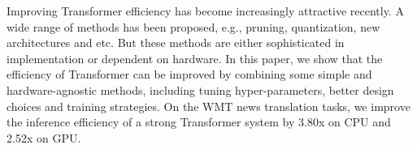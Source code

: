 Improving Transformer efficiency has become increasingly attractive recently. A wide range of methods has been proposed, e.g., pruning, quantization, new architectures and etc. But these methods are either sophisticated in implementation or dependent on hardware. In this paper, we show that the efficiency of Transformer can be improved by combining some simple and hardware-agnostic methods, including tuning hyper-parameters, better design choices and training strategies. On the WMT news translation tasks, we improve the inference efficiency of a strong Transformer system by 3.80x on CPU and 2.52x on GPU.
